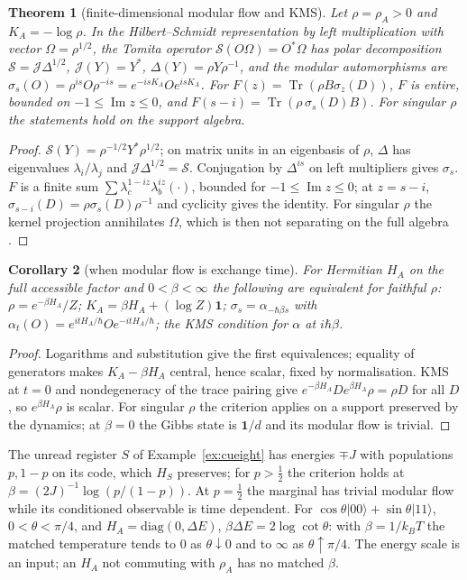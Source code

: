 \documentclass[aps,pra,onecolumn,superscriptaddress,nofootinbib,10pt]{revtex4-2}
\newtheorem{theorem}{Theorem}
\newtheorem{corollary}[theorem]{Corollary}
\theoremstyle{definition}
\theoremstyle{remark}
\newcommand{\im}{\operatorname{Im}}
\newcommand{\tr}{\operatorname{Tr}}
\begin{document}
\begin{theorem}[finite-dimensional modular flow and KMS]\label{thm:cumodular}
Let $\rho=\rho_A>0$ and $K_A=-\log\rho$.  In the Hilbert--Schmidt representation by left multiplication with vector
$\Omega=\rho^{1/2}$, the Tomita operator $\mathcal S(O\Omega)=O^*\Omega$ has polar decomposition $\mathcal S=\mathcal J\Delta^{1/2}$, $\mathcal J(Y)=Y^*$, $\Delta(Y)=\rho Y\rho^{-1}$,
and the modular automorphisms are $\sigma_s(O)=\rho^{is}O\rho^{-is}=e^{-isK_A}Oe^{isK_A}$.  For $F(z)=\tr(\rho B\sigma_z(D))$, $F$ is entire, bounded
on $-1\le\im z\le0$, and $F(s-i)=\tr(\rho\,\sigma_s(D)B)$.  For singular $\rho$ the statements hold on the support algebra.
\end{theorem}
\begin{proof}
$\mathcal S(Y)=\rho^{-1/2}Y^*\rho^{1/2}$; on matrix units in an eigenbasis of $\rho$, $\Delta$ has eigenvalues $\lambda_i/\lambda_j$ and $\mathcal J\Delta^{1/2}=\mathcal S$.
Conjugation by $\Delta^{is}$ on left multipliers gives $\sigma_s$.  $F$ is a finite sum $\sum\lambda_c^{1-iz}\lambda_b^{iz}(\cdot)$, bounded for
$-1\le\im z\le0$; at $z=s-i$, $\sigma_{s-i}(D)=\rho\sigma_s(D)\rho^{-1}$ and cyclicity gives the identity.  For singular $\rho$ the kernel
projection annihilates $\Omega$, which is then not separating on the full algebra \cite{n1-takesaki,n1-hhw}.
\end{proof}

\begin{corollary}[when modular flow is exchange time]\label{cor:cugibbs}
For Hermitian $H_A$ on the full accessible factor and $0<\beta<\infty$ the following are equivalent for faithful $\rho$:
$\rho=e^{-\beta H_A}/Z$; $K_A=\beta H_A+(\log Z)\mathbf1$; $\sigma_s=\alpha_{-\hbar\beta s}$ with $\alpha_t(O)=e^{itH_A/\hbar}Oe^{-itH_A/\hbar}$; the KMS condition for $\alpha$ at $i\hbar\beta$.
\end{corollary}
\begin{proof}
Logarithms and substitution give the first equivalences; equality of generators makes $K_A-\beta H_A$ central,
hence scalar, fixed by normalisation.  KMS at $t=0$ and nondegeneracy of the trace pairing give
$e^{-\beta H_A}De^{\beta H_A}\rho=\rho D$ for all $D$, so $e^{\beta H_A}\rho$ is scalar.  For singular $\rho$ the criterion applies on a support
preserved by the dynamics; at $\beta=0$ the Gibbs state is $\mathbf1/d$ and its modular flow is trivial.
\end{proof}
\noindent The unread register $S$ of Example~\ref{ex:cueight} has energies $\mp J$ with populations $p,1-p$ on its code, which $H_S$
preserves; for $p>\tfrac12$ the criterion holds at $\beta=(2J)^{-1}\log(p/(1-p))$.  At $p=\tfrac12$ the marginal has trivial modular flow
while its conditioned observable is time dependent.  For $\cos\theta\lvert00\rangle+\sin\theta\lvert11\rangle$, $0<\theta<\pi/4$, and $H_A=\mathrm{diag}(0,\Delta E)$,
$\beta\Delta E=2\log\cot\theta$: with $\beta=1/k_BT$ the matched temperature tends to $0$ as $\theta\downarrow0$ and to $\infty$ as $\theta\uparrow\pi/4$.  The
energy scale is an input; an $H_A$ not commuting with $\rho_A$ has no matched $\beta$.
\end{document}
